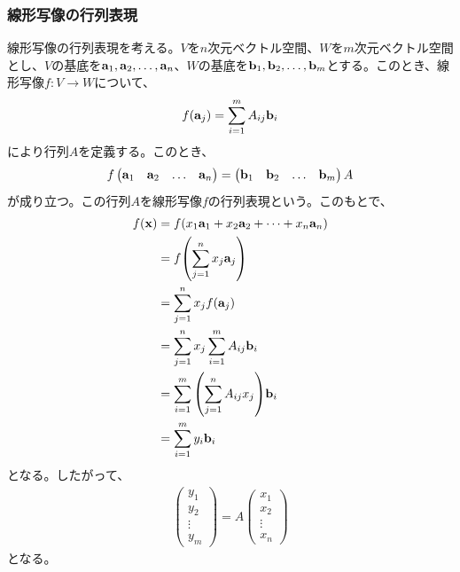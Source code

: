 \documentclass[a4paper,11pt]{jsarticle}
\numberwithin{equation}{section}
\begin{document}
\subsubsection{線形写像の行列表現}
線形写像の行列表現を考える。$V$を$n$次元ベクトル空間、$W$を$m$次元ベクトル空間とし、$V$の基底を$\vb{a}_1, \vb{a}_2, \dots, \vb{a}_n$、$W$の基底を$\vb{b}_1, \vb{b}_2, \dots, \vb{b}_m$とする。このとき、線形写像$f:V \to W$について、
\begin{align}
  f(\vb{a}_j) = \sum_{i=1}^{m} A_{ij} \vb{b}_i
\end{align}
により行列$A$を定義する。このとき、
\begin{align}
  f
  \begin{pmatrix}
    \vb{a}_1 & \vb{a}_2 & \dots & \vb{a}_n
  \end{pmatrix}
  =
  \begin{pmatrix}
    \vb{b}_1 & \vb{b}_2 & \dots & \vb{b}_m
  \end{pmatrix}
  A
\end{align}
が成り立つ。この行列$A$を線形写像$f$の行列表現という。このもとで、
\begin{align}
  f(\vb{x}) &=f(x_1\vb{a}_1 + x_2\vb{a}_2 + \dots + x_n\vb{a}_n)\\
  &=f\qty(\sum_{j=1}^{n} x_j\vb{a}_j)\\
  &=\sum_{j=1}^{n} x_j f(\vb{a}_j)\\
  &=\sum_{j=1}^{n} x_j \sum_{i=1}^{m} A_{ij} \vb{b}_i\\
  &=\sum_{i=1}^{m} \qty(\sum_{j=1}^{n} A_{ij}x_j) \vb{b}_i\\
  &=\sum_{i=1}^{m} y_i \vb{b}_i
\end{align}
となる。したがって、
\begin{align}
  \begin{pmatrix}
    y_1\\
    y_2\\
    \vdots\\
    y_m
  \end{pmatrix}
  = A
  \begin{pmatrix}
    x_1\\
    x_2\\
    \vdots\\
    x_n
  \end{pmatrix}
\end{align}
となる。
\end{document}
